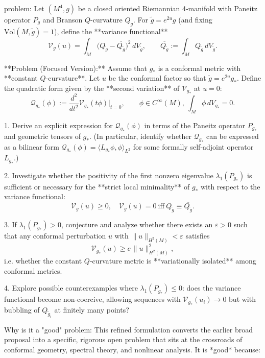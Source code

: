problem:  
Let \((M^4,g)\) be a closed oriented Riemannian 4‑manifold with Paneitz operator \(P_g\) and Branson \(Q\)-curvature \(Q_g\).  
For \(\tilde g = e^{2u} g\) (and fixing \(\mathrm{Vol}(M,\tilde g)=1\)), define the **variance functional**
\[
\mathcal V_g(u) = \int_M \bigl(Q_{\tilde g}-\overline{Q_{\tilde g}}\bigr)^2 \,dV_{\tilde g}, 
\qquad 
\overline{Q_{\tilde g}} := \int_M Q_{\tilde g}\,dV_{\tilde g}.
\]

**Problem (Focused Version):**  
Assume that \(g_*\) is a conformal metric with **constant \(Q\)-curvature**.  
Let \(u\) be the conformal factor so that \(\tilde g = e^{2u} g_*\).  
Define the quadratic form given by the **second variation** of \(\mathcal V_{g_*}\) at \(u=0\):
\[
\mathcal Q_{g_*}(\phi) := \frac{d^2}{dt^2}\mathcal V_{g_*}(t\phi)\Big|_{t=0}, 
\qquad \phi\in C^\infty(M), \ \int_M \phi\, dV_{g_*}=0.
\]

1. Derive an explicit expression for \(\mathcal Q_{g_*}(\phi)\) in terms of the Paneitz operator \(P_{g_*}\) and geometric tensors of \(g_*\).  
   (In particular, identify whether \(\mathcal Q_{g_*}\) can be expressed as a bilinear form
   \(\mathcal Q_{g_*}(\phi) = \langle L_{g_*}\phi,\phi\rangle_{L^2}\) for some formally self‑adjoint operator \(L_{g_*}\).)

2. Investigate whether the positivity of the first nonzero eigenvalue \(\lambda_1(P_{g_*})\) is sufficient or necessary for the **strict local minimality** of \(g_*\) with respect to the variance functional:
   \[
   \mathcal V_g(u)\ge 0,\quad 
   \mathcal V_g(u)=0 \ \text{iff}\ Q_{\tilde g}\equiv \overline{Q_{\tilde g}}.
   \]

3. If \(\lambda_1(P_{g_*})>0\), conjecture and analyze whether there exists an \(\varepsilon>0\) such that any conformal perturbation \(u\) with \(\|u\|_{H^2(M)}<\varepsilon\) satisfies
   \[
   \mathcal V_{g_*}(u) \ge c\, \|u\|_{H^2(M)}^2,
   \]
   i.e. whether the constant \(Q\)-curvature metric is **variationally isolated** among conformal metrics.

4. Explore possible counterexamples where \(\lambda_1(P_{g_*})\le 0\):  
   does the variance functional become non‑coercive, allowing sequences with \(\mathcal V_{g_*}(u_i)\to 0\) but with bubbling of \(Q_{\tilde g_i}\) at finitely many points?

Why is it a "good" problem:  
This refined formulation converts the earlier broad proposal into a specific, rigorous open problem that sits at the crossroads of conformal geometry, spectral theory, and nonlinear analysis. It is *good* because:  

